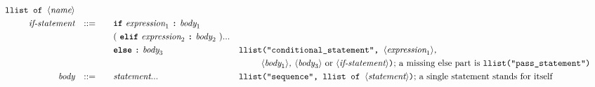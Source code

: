 \begin{alignat*}{9}
                                                            && \texttt{llist of  } \langle \textit{name}\rangle                                                                                                                       \\
  && \textit{if-statement} && ::= &\quad && \term{if}\ \textit{expression}_1\ \term{:}\ \textit{body}_1 \\
  &&                       &&     &\quad && (\ \term{elif}\ \textit{expression}_2\ \term{:}\ \textit{body}_2\ )...                                                                                                                          \\
  &&                       &&     &\quad && \term{else}\ \term{:}\ \textit{body}_3
                                                            && \texttt{llist("conditional\_statement",  } \langle \textit{expression}_1\rangle \textit{, }                                                                            \\
                                                            &&&&&&&&&\ \ \ \ \ \ \texttt{ } \langle \textit{body}_1\rangle \textit{,  } \langle \textit{body}_3\rangle \ \textrm{or}\ \langle \textit{if-statement} \rangle \texttt{)} \textrm{; a missing else part is } \texttt{llist("pass\_statement")}     \\
  && \textit{body}         && ::= &\quad && \textit{statement}... \quad
                                                            && \texttt{llist("sequence", llist of  } \langle \textit{statement}\rangle \texttt{)} \textrm{; a single statement stands for itself}                                                                                                 \\
\end{alignat*}

